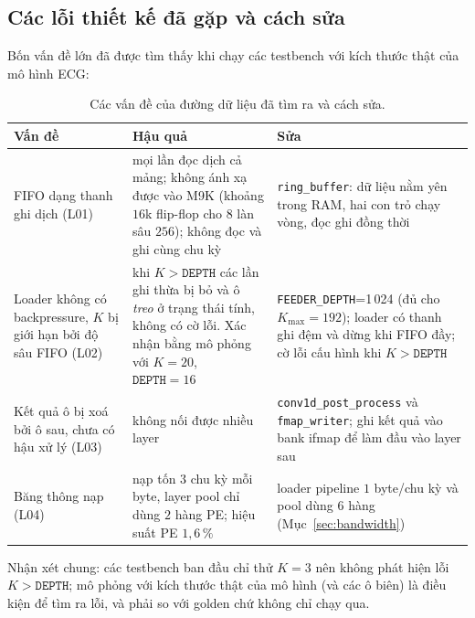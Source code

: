 \subsection{Các lỗi thiết kế đã gặp và cách sửa}
Bốn vấn đề lớn đã được tìm thấy khi chạy các testbench với kích thước thật của mô hình ECG:

\begin{table}[htbp]\centering
\caption{Các vấn đề của đường dữ liệu đã tìm ra và cách sửa.}\label{tab:loi}
\footnotesize\setlength{\tabcolsep}{4pt}
\begin{tabular}{@{}p{3.2cm}p{4.9cm}p{5.5cm}@{}}
\toprule
Vấn đề & Hậu quả & Sửa \\ \midrule
FIFO dạng thanh ghi dịch (L01) & mọi lần đọc dịch cả mảng; không ánh xạ được vào M9K (khoảng $16$k flip-flop cho $8$ làn sâu $256$); không đọc và ghi cùng chu kỳ & \texttt{ring\_buffer}: dữ liệu nằm yên trong RAM, hai con trỏ chạy vòng, đọc ghi đồng thời \\
Loader không có backpressure, $K$ bị giới hạn bởi độ sâu FIFO (L02) & khi $K>\texttt{DEPTH}$ các lần ghi thừa bị bỏ và ô \emph{treo} ở trạng thái tính, không có cờ lỗi. Xác nhận bằng mô phỏng với $K=20$, $\texttt{DEPTH}=16$ & \texttt{FEEDER\_DEPTH}=1\,024 (đủ cho $K_{\max}=192$); loader có thanh ghi đệm và dừng khi FIFO đầy; cờ lỗi cấu hình khi $K>\texttt{DEPTH}$ \\
Kết quả ô bị xoá bởi ô sau, chưa có hậu xử lý (L03) & không nối được nhiều layer & \texttt{conv1d\_post\_process} và \texttt{fmap\_writer}; ghi kết quả vào bank ifmap để làm đầu vào layer sau \\
Băng thông nạp (L04) & nạp tốn $3$ chu kỳ mỗi byte, layer pool chỉ dùng $2$ hàng PE; hiệu suất PE $1{,}6\,\%$ & loader pipeline $1$ byte/chu kỳ và pool dùng $6$ hàng (Mục~\ref{sec:bandwidth}) \\ \bottomrule
\end{tabular}
\end{table}

Nhận xét chung: các testbench ban đầu chỉ thử $K=3$ nên không phát hiện lỗi $K>\texttt{DEPTH}$; mô phỏng với kích thước thật của mô hình (và các ô biên) là điều kiện để tìm ra lỗi, và phải so với golden chứ không chỉ chạy qua.

